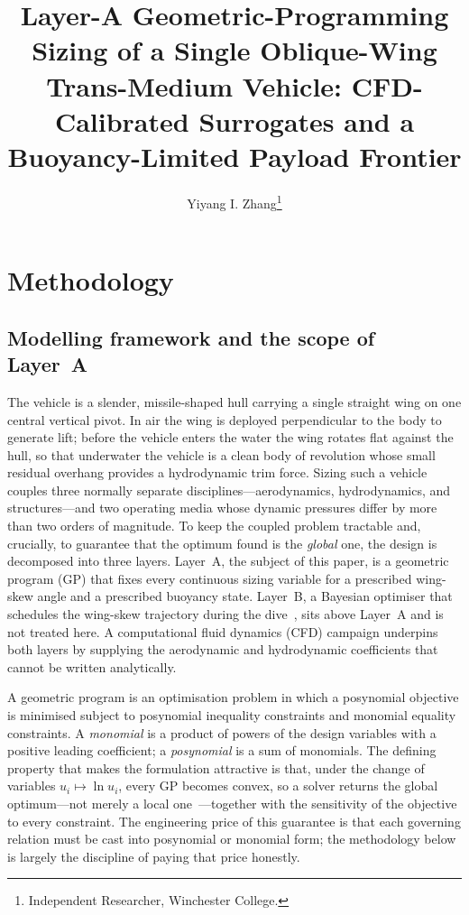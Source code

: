 \documentclass[conf]{new-aiaa}
\title{Layer-A Geometric-Programming Sizing of a Single Oblique-Wing Trans-Medium Vehicle: CFD-Calibrated Surrogates and a Buoyancy-Limited Payload Frontier}
\author{Yiyang I. Zhang\footnote{Independent Researcher, Winchester College.}}
\affil{Winchester College, Winchester, United Kingdom}
\begin{document}
\maketitle

\section{Methodology}

\subsection{Modelling framework and the scope of Layer~A}
The vehicle is a slender, missile-shaped hull carrying a single straight wing on one central
vertical pivot. In air the wing is deployed perpendicular to the body to generate lift; before the
vehicle enters the water the wing rotates flat against the hull, so that underwater the vehicle is a
clean body of revolution whose small residual overhang provides a hydrodynamic trim force. Sizing
such a vehicle couples three normally separate disciplines---aerodynamics, hydrodynamics, and
structures---and two operating media whose dynamic pressures differ by more than two orders of
magnitude. To keep the coupled problem tractable and, crucially, to guarantee that the optimum found
is the \emph{global} one, the design is decomposed into three layers. Layer~A, the subject of this
paper, is a geometric program (GP) that fixes every continuous sizing variable for a prescribed
wing-skew angle and a prescribed buoyancy state. Layer~B, a Bayesian optimiser that schedules the
wing-skew trajectory during the dive~\cite{long2025entire}, sits above Layer~A and is not treated here. A computational
fluid dynamics (CFD) campaign underpins both layers by supplying the aerodynamic and hydrodynamic
coefficients that cannot be written analytically.

A geometric program is an optimisation problem in which a posynomial objective is minimised subject
to posynomial inequality constraints and monomial equality constraints. A \emph{monomial} is a
product of powers of the design variables with a positive leading coefficient; a \emph{posynomial}
is a sum of monomials. The defining property that makes the formulation attractive is that, under the
change of variables $u_i\mapsto\ln u_i$, every GP becomes convex, so a solver returns the global
optimum---not merely a local one~\cite{boyd2007tutorial}---together with the sensitivity of the objective to every
constraint. The engineering price of this guarantee is that each governing relation must be cast into
posynomial or monomial form; the methodology below is largely the discipline of paying that price
honestly.
\end{document}
